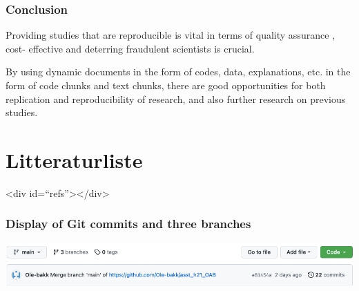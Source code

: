 \documentclass[
  12pt,
  norsk,
]{article}
\begin{document}
\hypertarget{conclusion}{%
\subsubsection{\texorpdfstring{\textbf{Conclusion}}{Conclusion}}\label{conclusion}}

Providing studies that are reproducible is vital in terms of quality
assurance , cost- effective and deterring fraudulent scientists is
crucial.

By using dynamic documents in the form of codes, data, explanations,
etc. in the form of code chunks and text chunks, there are good
opportunities for both replication and reproducibility of research, and
also further research on previous studies.

\newpage

\hypertarget{litteraturliste}{%
\section{Litteraturliste}\label{litteraturliste}}

\textless div id=``refs''\textgreater\textless/div\textgreater{}

\hypertarget{display-of-git-commits-and-three-branches}{%
\subsubsection{Display of Git commits and three
branches}\label{display-of-git-commits-and-three-branches}}

\includegraphics{images/paste-7A7BFE4C.png}
\end{document}
